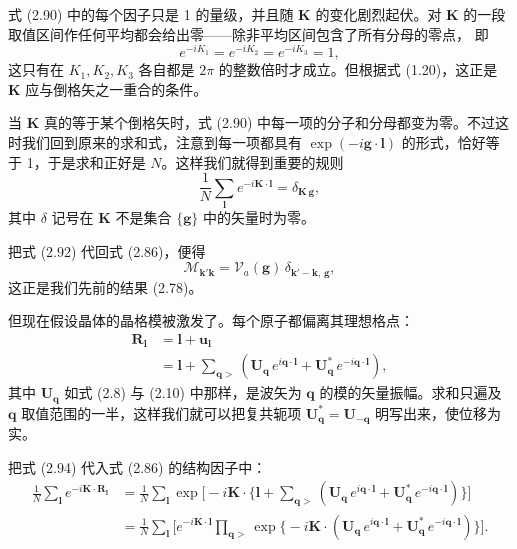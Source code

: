 式 (2.90) 中的每个因子只是 1 的量级，并且随 $\mathbf{K}$ 的变化剧烈起伏。对
$\mathbf{K}$ 的一段取值区间作任何平均都会给出零——除非平均区间包含了所有分母的零点，
即
\begin{equation*}
e^{-iK_1} = e^{-iK_2} = e^{-iK_3} = 1,
\tag{2.91}
\end{equation*}
这只有在 $K_1, K_2, K_3$ 各自都是 $2\pi$
的整数倍时才成立。但根据式 (1.20)，这正是 $\mathbf{K}$
应与倒格矢之一重合的条件。

当 $\mathbf{K}$ 真的等于某个倒格矢时，式 (2.90)
中每一项的分子和分母都变为零。不过这时我们回到原来的求和式，注意到每一项都具有
$\exp(-i\mathbf{g}\cdot\boldsymbol{l})$ 的形式，恰好等于 1，于是求和正好是
$N$。这样我们就得到重要的规则
\begin{equation*}
\frac{1}{N} \sum_{\boldsymbol{l}} e^{-i\mathbf{K}\cdot\boldsymbol{l}}
= \delta_{\mathbf{K}\,\mathbf{g}},
\tag{2.92}
\end{equation*}
其中 $\delta$ 记号在 $\mathbf{K}$ 不是集合 $\{\mathbf{g}\}$
中的矢量时为零。

把式 (2.92) 代回式 (2.86)，便得
\begin{equation*}
\mathcal{M}_{\mathbf{k}'\mathbf{k}}
= \mathcal{V}_a(\mathbf{g})\, \delta_{\mathbf{k}'-\mathbf{k},\,\mathbf{g}},
\tag{2.93}
\end{equation*}
这正是我们先前的结果 (2.78)。

但现在假设晶体的晶格模被激发了。每个原子都偏离其理想格点：
\begin{align*}
\mathbf{R}_{\boldsymbol{l}} &= \boldsymbol{l} + \mathbf{u}_{\boldsymbol{l}} \\
&= \boldsymbol{l} + \sum_{\mathbf{q}>}
\left( \mathbf{U}_{\mathbf{q}}\, e^{i\mathbf{q}\cdot\boldsymbol{l}}
+ \mathbf{U}_{\mathbf{q}}^{*}\, e^{-i\mathbf{q}\cdot\boldsymbol{l}} \right),
\tag{2.94}
\end{align*}
其中 $\mathbf{U}_{\mathbf{q}}$ 如式 (2.8) 与 (2.10)
中那样，是波矢为 $\mathbf{q}$ 的模的矢量振幅。求和只遍及 $\mathbf{q}$
取值范围的一半，这样我们就可以把复共轭项 $\mathbf{U}_{\mathbf{q}}^{*} =
\mathbf{U}_{-\mathbf{q}}$ 明写出来，使位移为实。

把式 (2.94) 代入式 (2.86) 的结构因子中：
\begin{align*}
\frac{1}{N} \sum_{\boldsymbol{l}} e^{-i\mathbf{K}\cdot\mathbf{R}_{\boldsymbol{l}}}
&= \frac{1}{N} \sum_{\boldsymbol{l}} \exp\bigl[ -i\mathbf{K}\cdot
\bigl\{ \boldsymbol{l} + \sum_{\mathbf{q}>}
(\mathbf{U}_{\mathbf{q}}\, e^{i\mathbf{q}\cdot\boldsymbol{l}}
+ \mathbf{U}_{\mathbf{q}}^{*}\, e^{-i\mathbf{q}\cdot\boldsymbol{l}}) \bigr\} \bigr] \\
&= \frac{1}{N} \sum_{\boldsymbol{l}} \bigl[ e^{-i\mathbf{K}\cdot\boldsymbol{l}}
\prod_{\mathbf{q}>} \exp\bigl\{ -i\mathbf{K}\cdot
(\mathbf{U}_{\mathbf{q}}\, e^{i\mathbf{q}\cdot\boldsymbol{l}}
+ \mathbf{U}_{\mathbf{q}}^{*}\, e^{-i\mathbf{q}\cdot\boldsymbol{l}}) \bigr\}
\bigr].
\tag{2.95}
\end{align*}

